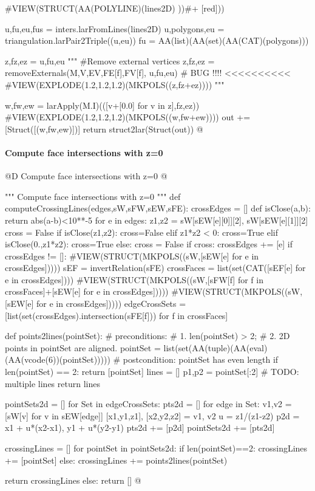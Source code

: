 \documentclass[11pt,oneside]{article}    %
\begin{document}
{        #VIEW(STRUCT(AA(POLYLINE)(lines2D) ))#+ [red]))
        
        u,fu,eu,fus = inters.larFromLines(lines2D)
        u,polygons,eu = triangulation.larPair2Triple((u,eu))
        fu = AA(list)(AA(set)(AA(CAT)(polygons)))
        
        z,fz,ez = u,fu,eu
        """ 
        #Remove external vertices 
        z,fz,ez = removeExternals(M,V,EV,FE[f],FV[f], u,fu,eu)  # BUG !!!!  <<<<<<<<<<
        #VIEW(EXPLODE(1.2,1.2,1.2)(MKPOLS((z,fz+ez))))
        """
        
        w,fw,ew = larApply(M.I)(([v+[0.0] for v in z],fz,ez))
        #VIEW(EXPLODE(1.2,1.2,1.2)(MKPOLS((w,fw+ew))))
        out += [Struct([(w,fw,ew)])]
    return struct2lar(Struct(out))
@}

\paragraph{Compute face intersections with z=0}
@D Compute face intersections with z=0
@{""" Compute face intersections with z=0 """
def computeCrossingLines(edges,sW,sFW,sEW,sFE):
	crossEdges = []
	def isClose(a,b): return abs(a-b)<10**-5
	for e in edges:
		z1,z2 = sW[sEW[e][0]][2], sW[sEW[e][1]][2]
		cross = False
		if isClose(z1,z2):	cross=False
		elif z1*z2 < 0:		cross=True
		elif isClose(0.,z1*z2): cross=True
		else: cross = False
		if cross: crossEdges += [e]	
	if crossEdges != []:
		#VIEW(STRUCT(MKPOLS((sW,[sEW[e] for e in crossEdges]))))
		sEF = invertRelation(sFE)
		crossFaces = list(set(CAT([sEF[e] for e in crossEdges])))
		#VIEW(STRUCT(MKPOLS((sW,[sFW[f] for f in crossFaces]+[sEW[e] for e in crossEdges]))))
		#VIEW(STRUCT(MKPOLS((sW,[sEW[e] for e in crossEdges]))))
		edgeCrossSets = [list(set(crossEdges).intersection(sFE[f])) for f in crossFaces]		
		
		def points2lines(pointSet):
			#	preconditions:
			#	1.	len(pointSet) > 2;
			#	2.	2D points in pointSet are aligned.
			pointSet = list(set(AA(tuple)(AA(eval)(AA(vcode(6))(pointSet)))))
			# postcondition: pointSet has even length
			if len(pointSet) == 2: return [pointSet]
			lines = []
			p1,p2 = pointSet[:2]
			# TODO: multiple lines
			return lines

		pointSets2d = []
		for Set in edgeCrossSets:
			pts2d = []
			for edge in Set:
				v1,v2 = [sW[v] for v in sEW[edge]]
				[x1,y1,z1], [x2,y2,z2] = v1, v2
				u = z1/(z1-z2)
				p2d = x1 + u*(x2-x1), y1 + u*(y2-y1)
				pts2d += [p2d]
			pointSets2d += [pts2d]

		crossingLines = []
		for pointSet in pointSets2d:
			if len(pointSet)==2:
				crossingLines += [pointSet]
			else:
				crossingLines += points2lines(pointSet)

		return crossingLines
	else: return []
@}
\end{document}
